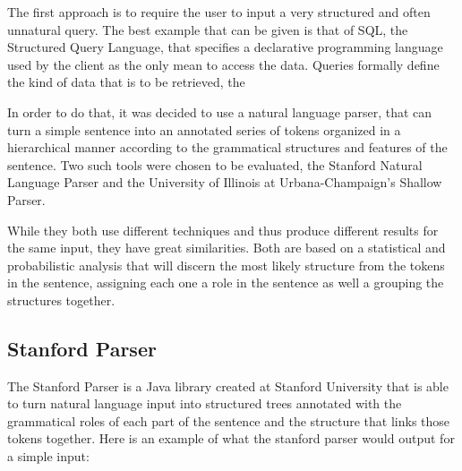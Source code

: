 The first approach is to require the user to input a very structured and often unnatural query. The best example that can be given is that of SQL, the Structured Query Language, that specifies a declarative programming language used by the client as the only mean to access the data. Queries formally define the kind of data that is to be retrieved, the 


 In order to do that, it was decided to use a natural language parser, that can turn a simple sentence into an annotated series of tokens organized in a hierarchical manner according to the grammatical structures and features of the sentence. Two such tools were chosen to be evaluated, the Stanford Natural Language Parser and the University of Illinois at Urbana-Champaign's Shallow Parser. 

While they both use different techniques and thus produce different results for the same input, they have great similarities. Both are based on a statistical and probabilistic analysis that will discern the most likely structure from the tokens in the sentence, assigning each one a role in the sentence as well a grouping the structures together.

\subsection{Stanford Parser} %
\label{sub:stanford_parser}
The Stanford Parser is a Java library created at Stanford University that is able to turn natural language input into structured trees annotated with the grammatical roles of each part of the sentence and the structure that links those tokens together. Here is an example of what the stanford parser would output for a simple input:

